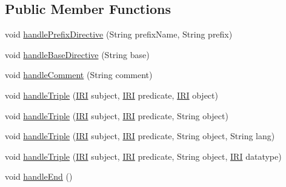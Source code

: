 \subsection*{Public Member Functions}
\begin{DoxyCompactItemize}
\item 
void \hyperlink{classuk_1_1ac_1_1manchester_1_1cs_1_1owl_1_1owlapi_1_1turtle_1_1parser_1_1_null_triple_handler_af22e4473fdabeceac3ff313706447cfe}{handle\-Prefix\-Directive} (String prefix\-Name, String prefix)
\item 
void \hyperlink{classuk_1_1ac_1_1manchester_1_1cs_1_1owl_1_1owlapi_1_1turtle_1_1parser_1_1_null_triple_handler_a7f45e0bc01a879926029ad841b88b103}{handle\-Base\-Directive} (String base)
\item 
void \hyperlink{classuk_1_1ac_1_1manchester_1_1cs_1_1owl_1_1owlapi_1_1turtle_1_1parser_1_1_null_triple_handler_a45b17400b4a2df97aba0057b2f8f1eb9}{handle\-Comment} (String comment)
\item 
void \hyperlink{classuk_1_1ac_1_1manchester_1_1cs_1_1owl_1_1owlapi_1_1turtle_1_1parser_1_1_null_triple_handler_ad90c1e9ff96dbed43f263aa1b5cba806}{handle\-Triple} (\hyperlink{classorg_1_1semanticweb_1_1owlapi_1_1model_1_1_i_r_i}{I\-R\-I} subject, \hyperlink{classorg_1_1semanticweb_1_1owlapi_1_1model_1_1_i_r_i}{I\-R\-I} predicate, \hyperlink{classorg_1_1semanticweb_1_1owlapi_1_1model_1_1_i_r_i}{I\-R\-I} object)
\item 
void \hyperlink{classuk_1_1ac_1_1manchester_1_1cs_1_1owl_1_1owlapi_1_1turtle_1_1parser_1_1_null_triple_handler_a539373b5b503145bde7e20f6b90a0ddb}{handle\-Triple} (\hyperlink{classorg_1_1semanticweb_1_1owlapi_1_1model_1_1_i_r_i}{I\-R\-I} subject, \hyperlink{classorg_1_1semanticweb_1_1owlapi_1_1model_1_1_i_r_i}{I\-R\-I} predicate, String object)
\item 
void \hyperlink{classuk_1_1ac_1_1manchester_1_1cs_1_1owl_1_1owlapi_1_1turtle_1_1parser_1_1_null_triple_handler_aaa8220145a7078a15dd4bff8396f6be7}{handle\-Triple} (\hyperlink{classorg_1_1semanticweb_1_1owlapi_1_1model_1_1_i_r_i}{I\-R\-I} subject, \hyperlink{classorg_1_1semanticweb_1_1owlapi_1_1model_1_1_i_r_i}{I\-R\-I} predicate, String object, String lang)
\item 
void \hyperlink{classuk_1_1ac_1_1manchester_1_1cs_1_1owl_1_1owlapi_1_1turtle_1_1parser_1_1_null_triple_handler_a5dc6c7a969ff9587721aa8705d34b3c1}{handle\-Triple} (\hyperlink{classorg_1_1semanticweb_1_1owlapi_1_1model_1_1_i_r_i}{I\-R\-I} subject, \hyperlink{classorg_1_1semanticweb_1_1owlapi_1_1model_1_1_i_r_i}{I\-R\-I} predicate, String object, \hyperlink{classorg_1_1semanticweb_1_1owlapi_1_1model_1_1_i_r_i}{I\-R\-I} datatype)
\item 
void \hyperlink{classuk_1_1ac_1_1manchester_1_1cs_1_1owl_1_1owlapi_1_1turtle_1_1parser_1_1_null_triple_handler_aaed082eed64fc9fb8201438a96250f21}{handle\-End} ()
\end{DoxyCompactItemize}


